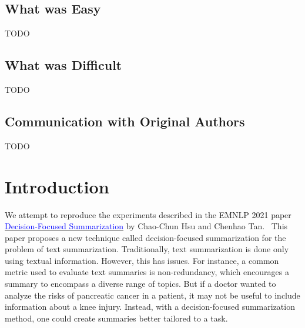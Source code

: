 \documentclass{article}
\newcommand{\blue}[1]{\textcolor{blue}{#1}}
\begin{document}
\subsection*{What was Easy}
TODO

\subsection*{What was Difficult}
TODO

\subsection*{Communication with Original Authors}
TODO
\newpage


\section{Introduction}
We attempt to reproduce the experiments described in the EMNLP 2021 paper \href{https://aclanthology.org/2021.emnlp-main.10.pdf}{\blue{Decision-Focused Summarization}} by Chao-Chun Hsu
and Chenhao Tan.~\cite{hsu-tan-2021-decision} This paper proposes a new technique called decision-focused summarization for the problem of text summarization. Traditionally, text summarization is done
only using textual information. However, this has issues. For instance, a common metric used to evaluate text summaries is non-redundancy, which encourages a summary to encompass a diverse range of
topics. But if a doctor wanted to analyze the risks of pancreatic cancer in a patient, it may not be useful to include information about a knee injury. Instead, with a decision-focused summarization
method, one could create summaries better tailored to a task. \\
\end{document}
